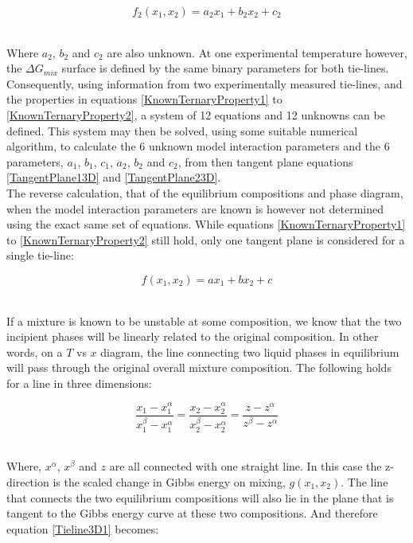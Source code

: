 \begin{equation}
f_{2}\left(x_{1}, x_{2}\right) = a_{2}x_{1} + b_{2}x_{2} +c_{2} \label{TangentPlane23D}
\end{equation}\

Where $a_{2}$, $b_{2}$ and $c_{2}$ are also unknown. At one experimental temperature however, the $\Delta G_{mix}$ surface is defined by the same binary parameters for both tie-lines. Consequently, using information from two experimentally measured tie-lines, and the properties in equations \ref{KnownTernaryProperty1} to \ref{KnownTernaryProperty2}, a system of 12 equations and 12 unknowns can be defined. This system may then be solved, using some suitable numerical algorithm, to calculate the 6 unknown model interaction parameters and the 6 parameters, $a_{1}$, $b_{1}$, $c_{1}$, $a_{2}$, $b_{2}$ and $c_{2}$, from then tangent plane equations \ref{TangentPlane13D} and \ref{TangentPlane23D}.\\

The reverse calculation, that of the equilibrium compositions and phase diagram, when the model interaction parameters are known is however not determined using the exact same set of equations. While equations \ref{KnownTernaryProperty1} to \ref{KnownTernaryProperty2} still hold, only one tangent plane is considered for a single tie-line:\

\begin{equation}
f\left(x_{1}, x_{2}\right) = ax_{1} + bx_{2} +c \label{TangentPlane3D}
\end{equation}\

If a mixture is known to be unstable at some composition, we know that the two incipient phases will be linearly related to the original composition. In other words, on a $T$ vs $x$ diagram, the line connecting two liquid phases in equilibrium will pass through the original overall mixture composition. The following holds for a line in three dimensions:\

\begin{equation}
\dfrac{x_{1}- x_{1}^{\alpha}}{x_{1}^{\beta} - x_{1}^{\alpha}} = \dfrac{x_{2}- x_{2}^{\alpha}}{x_{2}^{\beta} - x_{2}^{\alpha}} = \dfrac{z- z^{\alpha}}{z^{\beta} - z^{\alpha}} \label{Tieline3D1}
\end{equation}\

Where, $x^{\alpha}$, $x^{\beta}$ and $z$ are all connected with one straight line. In this case the z-direction is the scaled change in Gibbs energy on mixing, $g\left(x_{1}, x_{2}\right)$. The line that connects the two equilibrium compositions will also lie in the plane that is tangent to the Gibbs energy curve at these two compositions. And therefore equation \ref{Tieline3D1} becomes:\

